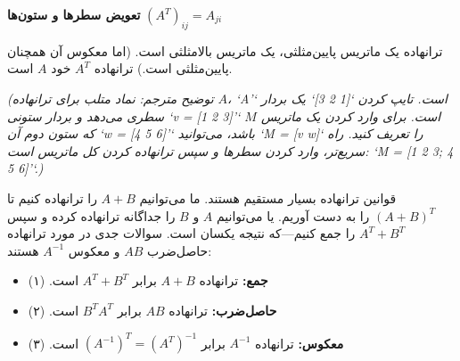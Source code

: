 \documentclass[12pt, a4paper]{book}
\begin{document}
	\textbf{تعویض سطرها و ستون‌ها} \quad $(A^T)_{ij} = A_{ji}$
	
	ترانهاده یک ماتریس پایین‌مثلثی، یک ماتریس بالامثلثی است. (اما معکوس آن همچنان پایین‌مثلثی است.) ترانهاده $A^T$ خود $A$ است.
	
	\textit{(توضیح مترجم: نماد متلب برای ترانهاده $A$، `A'` است. تایپ کردن `[1 2 3]` یک بردار سطری می‌دهد و بردار ستونی `v = [1 2 3]'` است. برای وارد کردن یک ماتریس $M$ که ستون دوم آن `w = [4 5 6]'` باشد، می‌توانید `M = [v w]` را تعریف کنید. راه سریع‌تر، وارد کردن سطرها و سپس ترانهاده کردن کل ماتریس است: `M = [1 2 3; 4 5 6]'`.)}
	
	قوانین ترانهاده بسیار مستقیم هستند. ما می‌توانیم $A+B$ را ترانهاده کنیم تا $(A+B)^T$ را به دست آوریم. یا می‌توانیم $A$ و $B$ را جداگانه ترانهاده کرده و سپس $A^T+B^T$ را جمع کنیم—که نتیجه یکسان است.
	سوالات جدی در مورد ترانهاده حاصل‌ضرب $AB$ و معکوس $A^{-1}$ هستند:
	
	\begin{itemize}
		\item \textbf{جمع:} ترانهاده $A+B$ برابر $A^T+B^T$ است. \quad (۱)
		\item \textbf{حاصل‌ضرب:} ترانهاده $AB$ برابر $B^TA^T$ است. \quad (۲)
		\item \textbf{معکوس:} ترانهاده $A^{-1}$ برابر $(A^{-1})^T = (A^T)^{-1}$ است. \quad (۳)
	\end{itemize}
	
\end{document}
